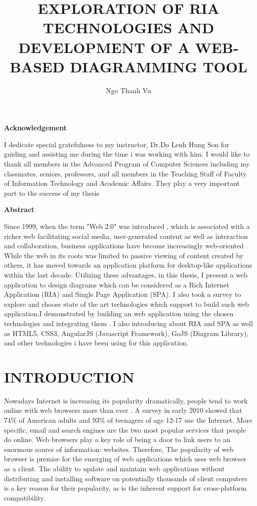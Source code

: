 \documentclass[14pt,a4paper]{extreport}
\author{Ngo Thanh Vu}
\title{EXPLORATION  OF  RIA  TECHNOLOGIES  AND  DEVELOPMENT  OF  A  WEB-BASED DIAGRAMMING TOOL}
\begin{document}
\maketitle
\tableofcontents
\listoffigures
\listoftables


\begin{titlepage}
\textbf{Acknowledgement}

I dedicate special gratefulness to my instructor, Dr.Do Lenh Hung Son for guiding and assisting me during the time i was working with him. I would like to thank all members in the Advanced Program of Computer Sciences including my classmates, seniors, professors, and all members in the Teaching Staff of Faculty of Information Technology and Academic Affairs. They play a very important part to the success of my thesis
\end{titlepage}

\begin{titlepage}
\textbf{Abstract}

Since 1999, when the term "Web 2.0" was introduced , which is associated with a richer web facilitating social media, user-generated content as well as interaction and collaboration, business applications have become increasingly web-oriented . While the web in its roots was limited to passive viewing of content created by others, it has moved towards an application platform for desktop-like applications within the last decade. Utilizing these advantages, in this thesis, I present a web application to design diagrams which can be considered as a Rich Internet Application (RIA) and Single Page Application (SPA). I also took a survey to explore and choose state of the art technologies which support to build such web application.I demonstrated by building an web application using the chosen technologies and integrating them . I also introducing about RIA and SPA as well as HTML5, CSS3, AngularJS (Javascript Framework), GoJS (Diagram Library), and other technologies i have been using for this application.

\end{titlepage}

\chapter{INTRODUCTION}

Nowadays Internet is increasing its popularity dramatically, people tend to work online with web browsers more than ever\cite{survey,Gvu,Center} . A survey in early 2010 \cite{Internet} showed that 74\% of American adults and 93\% of teenagers of age 12-17 use the Internet. More specific, email and search engines are the two most popular services that people do online\cite{Online}. Web browsers play a key role of being a door to link users to an enormous source of information: websites. Therefore, The popularity of web browser is premise for the emerging of web applications which uses web browser as a client. The ability to update and maintain web applications without distributing and installing software on potentially thousands of client computers is a key reason for their popularity, as is the inherent support for cross-platform compatibility\cite{WebApp}.
\\
\end{document}
